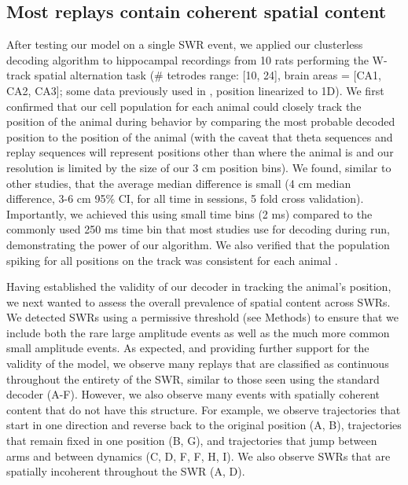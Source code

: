 \documentclass[9pt,lineno]{elife}
\begin{document}
\subsection*{Most replays contain coherent spatial content}

After testing our model on a single SWR event, we applied our clusterless decoding algorithm to hippocampal recordings from 10 rats performing the W-track spatial alternation task (\# tetrodes range: [10, 24], brain areas = [CA1, CA2, CA3]; some data previously used in \citep{KarlssonAwakereplayremote2009, KayConstantSubsecondCycling2020, CarrTransientSlowGamma2012}, position linearized to 1D). We first confirmed that our cell population for each animal could closely track the position of the animal during behavior by comparing the most probable decoded position to the position of the animal (with the caveat that theta sequences and replay sequences will represent positions other than where the animal is and our resolution is limited by the size of our 3 cm position bins). We found, similar to other studies, that the average median difference is small (4 cm median difference, 3-6 cm 95\% CI, for all time in sessions, 5 fold cross validation). Importantly, we achieved this using small time bins (2 ms) compared to the commonly used 250 ms time bin that most studies use for decoding during run, demonstrating the power of our algorithm. We also verified that the population spiking for all positions on the track was consistent for each animal .

Having established the validity of our decoder in tracking the animal's position, we next wanted to assess the overall prevalence of spatial content across SWRs. We detected SWRs using a permissive threshold (see Methods) to ensure that we include both the rare large amplitude events as well as the much more common small amplitude events. As expected, and providing further support for the validity of the model, we observe many replays that are classified as continuous throughout the entirety of the SWR, similar to those seen using the standard decoder (A-F). However, we also observe many events with spatially coherent content that do not have this structure. For example, we observe trajectories that start in one direction and reverse back to the original position (A, B), trajectories that remain fixed in one position (B, G), and trajectories that jump between arms and between dynamics (C, D, F, F, H, I). We also observe SWRs that are spatially incoherent throughout the SWR (A, D).
\end{document}
